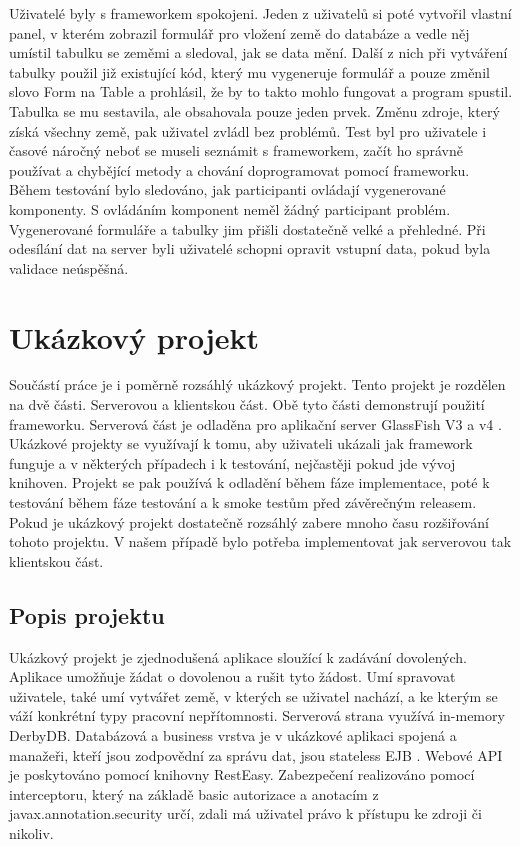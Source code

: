 Uživatelé byly s frameworkem spokojeni. Jeden z uživatelů si poté vytvořil vlastní panel, v kterém zobrazil formulář pro vložení země do databáze a vedle něj umístil tabulku se zeměmi a sledoval, jak se data mění. Další z nich při vytváření tabulky použil již existující kód, který mu vygeneruje formulář a pouze změnil slovo Form na Table a prohlásil, že by to takto mohlo fungovat a program spustil. Tabulka se mu sestavila, ale obsahovala pouze jeden prvek. Změnu zdroje, který získá všechny země, pak uživatel zvládl bez problémů. Test byl pro uživatele i časové náročný neboť se museli seznámit s frameworkem, začít ho správně používat a chybějící metody a chování doprogramovat pomocí frameworku. Během testování bylo sledováno, jak participanti ovládají vygenerované komponenty. S ovládáním komponent neměl žádný participant problém. Vygenerované formuláře a tabulky jim přišli dostatečně velké a přehledné. Při odesílání dat na server byli uživatelé schopni opravit vstupní data, pokud byla validace neúspěšná. 

\section{Ukázkový projekt}
Součástí práce je i poměrně rozsáhlý ukázkový projekt. Tento projekt je rozdělen na dvě části. Serverovou a klientskou část. Obě tyto části demonstrují použití frameworku. Serverová část je odladěna pro aplikační server GlassFish V3 a v4 \cite{glassfish}. Ukázkové projekty se využívají k tomu, aby uživateli ukázali jak framework funguje a v některých případech i k testování, nejčastěji pokud jde vývoj knihoven. Projekt se pak používá k odladění během fáze implementace, poté k testování během fáze testování a k smoke testům před závěrečným releasem. Pokud je ukázkový projekt dostatečně rozsáhlý zabere mnoho času rozšiřování tohoto projektu. V našem případě bylo potřeba implementovat jak serverovou tak klientskou část.
\subsection{Popis projektu}
Ukázkový projekt je zjednodušená aplikace sloužící k zadávání dovolených. Aplikace umožňuje žádat o dovolenou a rušit tyto žádost. Umí spravovat uživatele, také umí vytvářet země, v kterých se uživatel nachází, a ke kterým se váží konkrétní typy pracovní nepřítomnosti. Serverová strana využívá in-memory DerbyDB. Databázová a business vrstva je v ukázkové aplikaci spojená a manažeři, kteří jsou zodpovědní za správu dat, jsou stateless EJB \cite{javaEE}. Webové API je poskytováno pomocí knihovny RestEasy. Zabezpečení realizováno pomocí interceptoru, který na základě basic autorizace a anotacím z javax.annotation.security určí, zdali má uživatel právo k přístupu ke zdroji či nikoliv.

